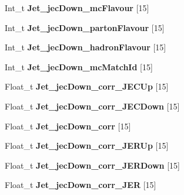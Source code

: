 \begin{DoxyCompactItemize}
\item 
\hypertarget{classMiniTree_a764b0ff9df8b99dc56b925e1d9ddc2cf}{}\label{classMiniTree_a764b0ff9df8b99dc56b925e1d9ddc2cf} 
Int\+\_\+t {\bfseries Jet\+\_\+jec\+Down\+\_\+mc\+Flavour} \mbox{[}15\mbox{]}
\item 
\hypertarget{classMiniTree_a529c1c058d6bc1a71d9e7fac4f96a2ce}{}\label{classMiniTree_a529c1c058d6bc1a71d9e7fac4f96a2ce} 
Int\+\_\+t {\bfseries Jet\+\_\+jec\+Down\+\_\+parton\+Flavour} \mbox{[}15\mbox{]}
\item 
\hypertarget{classMiniTree_a61d12ec504aa58402a92111f09150d38}{}\label{classMiniTree_a61d12ec504aa58402a92111f09150d38} 
Int\+\_\+t {\bfseries Jet\+\_\+jec\+Down\+\_\+hadron\+Flavour} \mbox{[}15\mbox{]}
\item 
\hypertarget{classMiniTree_a30048adce8fbf1c5a4a9e29c0cd50fac}{}\label{classMiniTree_a30048adce8fbf1c5a4a9e29c0cd50fac} 
Int\+\_\+t {\bfseries Jet\+\_\+jec\+Down\+\_\+mc\+Match\+Id} \mbox{[}15\mbox{]}
\item 
\hypertarget{classMiniTree_a9bf33fd1a2fb8b3afc8c93cdbb01af7b}{}\label{classMiniTree_a9bf33fd1a2fb8b3afc8c93cdbb01af7b} 
Float\+\_\+t {\bfseries Jet\+\_\+jec\+Down\+\_\+corr\+\_\+\+J\+E\+C\+Up} \mbox{[}15\mbox{]}
\item 
\hypertarget{classMiniTree_a6470a7aa89c567f79c21ad6b2bdee11e}{}\label{classMiniTree_a6470a7aa89c567f79c21ad6b2bdee11e} 
Float\+\_\+t {\bfseries Jet\+\_\+jec\+Down\+\_\+corr\+\_\+\+J\+E\+C\+Down} \mbox{[}15\mbox{]}
\item 
\hypertarget{classMiniTree_a1275d87d6b648bb9cb9bc1d8dffb7ad3}{}\label{classMiniTree_a1275d87d6b648bb9cb9bc1d8dffb7ad3} 
Float\+\_\+t {\bfseries Jet\+\_\+jec\+Down\+\_\+corr} \mbox{[}15\mbox{]}
\item 
\hypertarget{classMiniTree_ae5b8e387134ae3f70b273dca510614e9}{}\label{classMiniTree_ae5b8e387134ae3f70b273dca510614e9} 
Float\+\_\+t {\bfseries Jet\+\_\+jec\+Down\+\_\+corr\+\_\+\+J\+E\+R\+Up} \mbox{[}15\mbox{]}
\item 
\hypertarget{classMiniTree_a31d142d101c366bf5cde7bb79c279aea}{}\label{classMiniTree_a31d142d101c366bf5cde7bb79c279aea} 
Float\+\_\+t {\bfseries Jet\+\_\+jec\+Down\+\_\+corr\+\_\+\+J\+E\+R\+Down} \mbox{[}15\mbox{]}
\item 
\hypertarget{classMiniTree_ac8eab4313e6ffbc7d35580939209a4eb}{}\label{classMiniTree_ac8eab4313e6ffbc7d35580939209a4eb} 
Float\+\_\+t {\bfseries Jet\+\_\+jec\+Down\+\_\+corr\+\_\+\+J\+ER} \mbox{[}15\mbox{]}
\item 
\hypertarget{classMiniTree_a4eb4d279a8aab41f635fb23ede979ad1}{}\label{classMiniTree_a4eb4d279a8aab41f635fb23ede979ad1} 

\end{DoxyCompactItemize}
